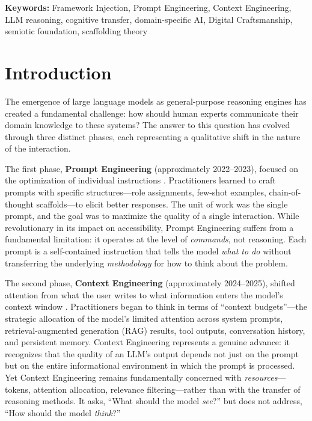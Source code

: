 \documentclass[12pt,a4paper]{article}
\begin{document}
\noindent\textbf{Keywords:} Framework Injection, Prompt Engineering, Context Engineering, LLM reasoning, cognitive transfer, domain-specific AI, Digital Craftsmanship, semiotic foundation, scaffolding theory

\section{Introduction}
\label{sec:introduction}

The emergence of large language models as general-purpose reasoning engines has created a fundamental challenge: how should human experts communicate their domain knowledge to these systems? The answer to this question has evolved through three distinct phases, each representing a qualitative shift in the nature of the interaction.

The first phase, \textbf{Prompt Engineering} (approximately 2022--2023), focused on the optimization of individual instructions \citep{goodside2022prompt,openai2023cookbook,schulhoff2024prompt}. Practitioners learned to craft prompts with specific structures---role assignments, few-shot examples, chain-of-thought scaffolds---to elicit better responses. The unit of work was the single prompt, and the goal was to maximize the quality of a single interaction. While revolutionary in its impact on accessibility, Prompt Engineering suffers from a fundamental limitation: it operates at the level of \emph{commands}, not reasoning. Each prompt is a self-contained instruction that tells the model \emph{what to do} without transferring the underlying \emph{methodology} for how to think about the problem.

The second phase, \textbf{Context Engineering} (approximately 2024--2025), shifted attention from what the user writes to what information enters the model's context window \citep{anthropic2025context}. Practitioners began to think in terms of ``context budgets''---the strategic allocation of the model's limited attention across system prompts, retrieval-augmented generation (RAG) results, tool outputs, conversation history, and persistent memory. Context Engineering represents a genuine advance: it recognizes that the quality of an LLM's output depends not just on the prompt but on the entire informational environment in which the prompt is processed. Yet Context Engineering remains fundamentally concerned with \emph{resources}---tokens, attention allocation, relevance filtering---rather than with the transfer of reasoning methods. It asks, ``What should the model \emph{see}?'' but does not address, ``How should the model \emph{think}?''
\end{document}
